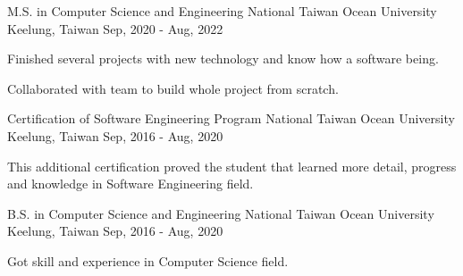

\begin{cventries}

  \cventry
    {M.S. in Computer Science and Engineering} %
    {National Taiwan Ocean University} %
    {Keelung, Taiwan} %
    {Sep, 2020 - Aug, 2022} %
    {
      \begin{cvitems} %
        \item {Finished several projects with new technology and know how a software being. }
        \item {Collaborated with team to build  whole project from scratch.}
      \end{cvitems}
    }

  \cventry
    {Certification of Software Engineering Program} %
    {National Taiwan Ocean University} %
    {Keelung, Taiwan} %
    {Sep, 2016 - Aug, 2020} %
    {
      \begin{cvitems} %
        \item {This additional certification proved the student that learned more detail, progress and knowledge in Software Engineering field.}
      \end{cvitems}
    }



  \cventry
    {B.S. in Computer Science and Engineering} %
    {National Taiwan Ocean University} %
    {Keelung, Taiwan} %
    {Sep, 2016 - Aug, 2020} %
    {
      \begin{cvitems} %
        \item {Got skill and experience in Computer Science field.}
      \end{cvitems}
    }


\end{cventries}
